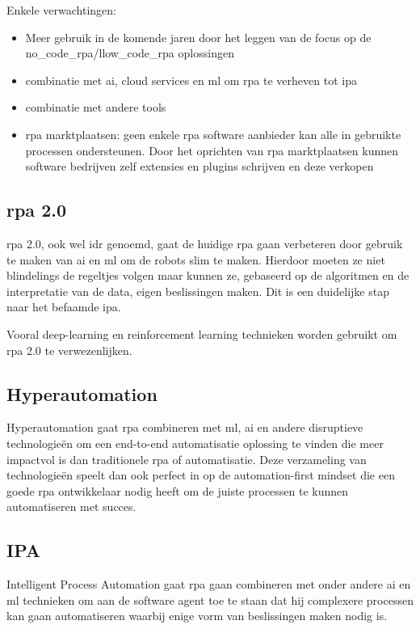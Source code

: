 Enkele verwachtingen:
\begin{itemize}
	\item Meer gebruik in de komende jaren door het leggen van de focus op de \gls{no_code_rpa}/l\gls{low_code_rpa} oplossingen 
	\item combinatie met \acrshort{ai}, cloud services en \acrshort{ml} om \acrshort{rpa} te verheven tot \acrshort{ipa}
	\item combinatie met andere tools
	\item \acrshort{rpa} marktplaatsen: geen enkele \acrshort{rpa} software aanbieder kan alle in gebruikte processen ondersteunen. Door het oprichten van \acrshort{rpa} marktplaatsen kunnen software bedrijven zelf extensies en plugins schrijven en deze verkopen
\end{itemize} \autocite{futureRPA}\autocite{everythingRPA}

\subsection{\acrshort{rpa} 2.0}
\acrshort{rpa} 2.0, ook wel \acrfull{idr} genoemd, gaat de huidige \acrshort{rpa} gaan verbeteren door gebruik te maken van  \acrshort{ai} en  \acrshort{ml} om de robots slim te maken. Hierdoor moeten ze niet blindelings de regeltjes volgen maar kunnen ze, gebaseerd op de algoritmen en de interpretatie van de data, eigen beslissingen maken. Dit is een duidelijke stap naar het befaamde  \acrshort{ipa}. \autocite{idrRPA}

Vooral deep-learning en reinforcement learning technieken worden gebruikt om \acrshort{rpa} 2.0 te verwezenlijken. \autocite{idrRPA}

\subsection{Hyperautomation}
Hyperautomation gaat \acrshort{rpa} combineren met  \acrshort{ml},  \acrshort{ai} en andere disruptieve technologieën om een end-to-end automatisatie oplossing te vinden die meer impactvol is dan traditionele \acrshort{rpa} of automatisatie. Deze verzameling van technologieën speelt dan ook perfect in op de automation-first mindset die een goede \acrshort{rpa} ontwikkelaar nodig heeft om de juiste processen te kunnen automatiseren met succes. \autocite{hyperautomation}

\subsection{IPA}
Intelligent Process Automation gaat \acrshort{rpa} gaan combineren met onder andere  \acrshort{ai} en  \acrshort{ml} technieken om aan de software agent toe te staan dat hij complexere processen kan gaan automatiseren waarbij enige vorm van beslissingen maken nodig is.

